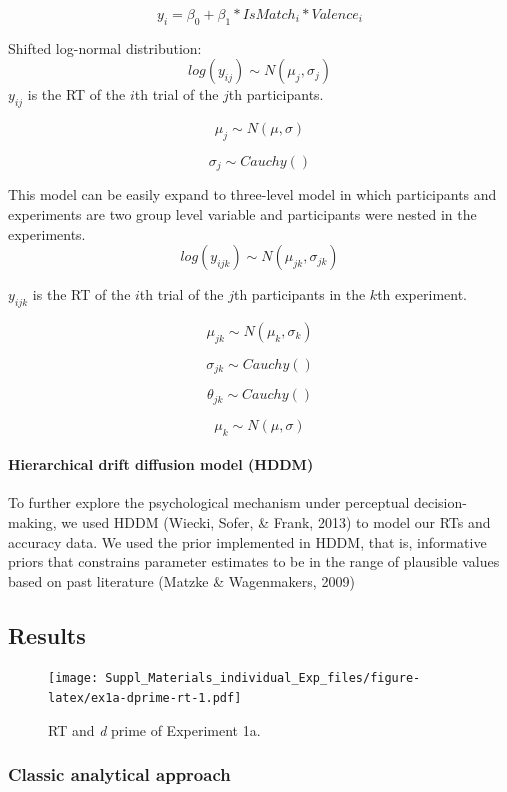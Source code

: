 \documentclass[
  english,
  man]{apa6}
\let\oldparagraph\paragraph
\renewcommand{\paragraph}[1]{\oldparagraph{#1}\mbox{}}
\begin{document}
\[y_{i} = \beta_{0} + \beta_{1}*IsMatch_{i} * Valence_{i}\]

Shifted log-normal distribution:
\[ log(y_{ij}) \sim N(\mu_{j}, \sigma_{j})\]
\(y_{ij}\) is the RT of the \(i\)th trial of the \(j\)th participants.

\[\mu_{j} \sim N(\mu, \sigma)\]

\[\sigma_{j} \sim Cauchy()\]

This model can be easily expand to three-level model in which participants and experiments are two group level variable and participants were nested in the experiments.
\[ log(y_{ijk}) \sim N(\mu_{jk}, \sigma_{jk})\]

\(y_{ijk}\) is the RT of the \(i\)th trial of the \(j\)th participants in the \(k\)th experiment.

\[\mu_{jk} \sim N(\mu_{k}, \sigma_{k})\]

\[\sigma_{jk} \sim Cauchy()\]

\[\theta_{jk} \sim Cauchy()\]

\[\mu_{k} \sim N(\mu, \sigma)\]

\hypertarget{hierarchical-drift-diffusion-model-hddm}{%
\paragraph{Hierarchical drift diffusion model (HDDM)}\label{hierarchical-drift-diffusion-model-hddm}}

To further explore the psychological mechanism under perceptual decision-making, we used HDDM (Wiecki, Sofer, \& Frank, 2013) to model our RTs and accuracy data. We used the prior implemented in HDDM, that is, informative priors that constrains parameter estimates to be in the range of plausible values based on past literature (Matzke \& Wagenmakers, 2009)

\hypertarget{results}{%
\subsection{Results}\label{results}}

\begin{figure}
\centering
\texttt{[image: Suppl\_Materials\_individual\_Exp\_files/figure-latex/ex1a-dprime-rt-1.pdf]}
\caption{\label{fig:ex1a-dprime-rt}RT and \emph{d} prime of Experiment 1a.}
\end{figure}

\hypertarget{classic-analytical-approach}{%
\subsubsection{Classic analytical approach}\label{classic-analytical-approach}}
\end{document}
